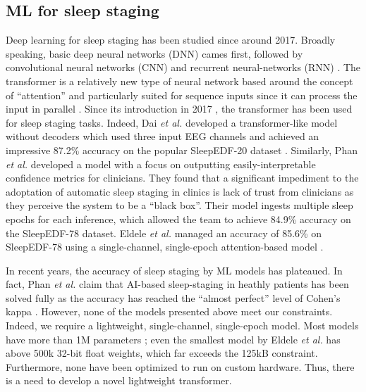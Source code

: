\documentclass[12pt, hidelinks]{article}
\begin{document}
    \subsection{ML for sleep staging}
    Deep learning for sleep staging has been studied since around 2017. Broadly speaking, basic deep neural networks (DNN) cames first, followed by convolutional neural networks (CNN) and recurrent neural-networks (RNN) \cite{phan2022sleeptransformer}.
    The transformer is a relatively new type of neural network based around the concept of ``attention'' and particularly suited for sequence inputs since it can process the input in parallel \cite{han2022survey}. Since its introduction in 2017 \cite{vaswani2017attention}, 
    the transformer has been used for sleep staging tasks. Indeed, Dai \textit{et al.} developed a transformer-like model without decoders which used three input EEG channels and achieved an impressive 87.2\% accuracy on the popular SleepEDF-20 dataset
    \cite{dai2023multichannelsleepnet}. Similarly, Phan \textit{et al.} developed a model with a focus on outputting easily-interpretable confidence metrics for clinicians. They found that a significant impediment to the adoptation of automatic sleep staging in clinics
    is lack of trust from clinicians as they perceive the system to be a ``black box''. Their model ingests multiple sleep epochs for each inference, which allowed the team to achieve 84.9\% accuracy on the SleepEDF-78 dataset. Eldele \textit{et al.} managed an
    accuracy of 85.6\% on SleepEDF-78 using a single-channel, single-epoch attention-based model \cite{eldele2021attention}.

    In recent years, the accuracy of sleep staging by ML models has plateaued. In fact, Phan \textit{et al.} claim that AI-based sleep-staging in heathly patients has been solved fully as the accuracy has reached the ``almost perfect'' level of Cohen's kappa
    \cite{phan2022automatic}. However, none of the models presented above meet our constraints. Indeed, we require a lightweight, single-channel, single-epoch model. Most models have more than 1M parameters \cite{phan2022sleeptransformer}; even the smallest
    model by Eldele \textit{et al.} has above 500k 32-bit float weights, which far exceeds the 125kB constraint. Furthermore, none have been optimized to run on custom hardware. Thus, there is a need to develop a novel lightweight transformer.

\end{document}
